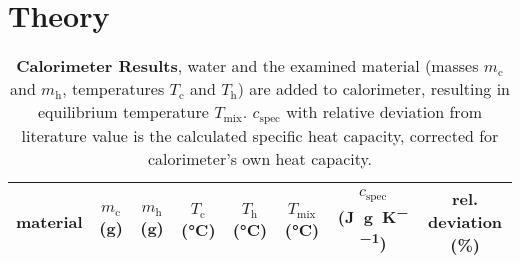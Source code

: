 \chapter{Theory}

\begin{table}
	\centering
	\caption[Calorimeter Results]{\textbf{Calorimeter Results}, water and the examined material (masses $m_\text{c}$ and $m_\text{h}$, temperatures $T_\text{c}$ and $T_\text{h}$) are added to calorimeter, resulting in equilibrium temperature $T_\text{mix}$. $c_\text{spec}$ with relative deviation from literature value is the calculated specific heat capacity, corrected for calorimeter's own heat capacity.}
	\begin{tabular}{lSSSSSSS[retain-explicit-plus]}
	\toprule
	{material}&
	{$m_\text{c}$ (\si{\gram})}&
	{$m_\text{h}$ (\si{\gram})}&
	{$T_\text{c}$ (\si{\celsius})}&
	{$T_\text{h}$ (\si{\celsius})}&
	{$T_\text{mix}$ (\si{\celsius})}&
	{$c_\text{spec}$ (\si{\joule\per\gram\per\kelvin})}&
	{rel. deviation (\si{\percent})}\\
	\midrule
		
	\bottomrule
	\end{tabular}
\end{table}

